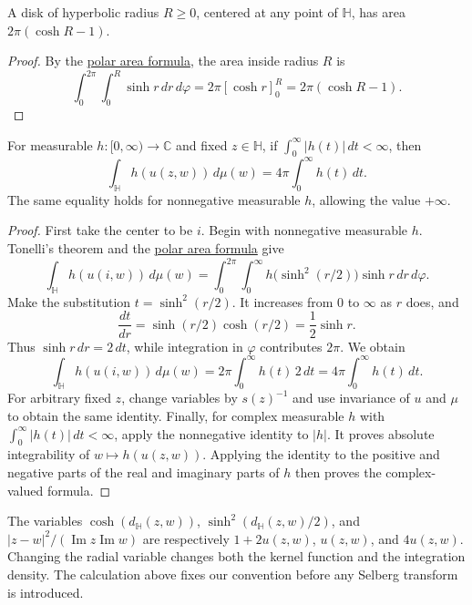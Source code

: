 \begin{corollary}\label{hyperbolic.ball-area}
A disk of hyperbolic radius $R\geq0$, centered at any point of $\mathbb H$, has area $2\pi(\cosh R-1)$.
\end{corollary}

\begin{proof}
By the \hyperref[hyperbolic.polar-coordinates]{polar area formula}, the area inside radius $R$ is
\[
 \int_0^{2\pi}\int_0^R\sinh r\,dr\,d\varphi
 =2\pi[\cosh r]_0^R=2\pi(\cosh R-1).
\]
\end{proof}

\begin{proposition}\label{hyperbolic.radial-integration}
For measurable $h:[0,\infty)\to\mathbb C$ and fixed $z\in\mathbb H$, if $\int_0^\infty|h(t)|\,dt<\infty$, then
\[
 \int_{\mathbb H}h(u(z,w))\,d\mu(w)=4\pi\int_0^\infty h(t)\,dt.
\]
The same equality holds for nonnegative measurable $h$, allowing the value $+\infty$.
\end{proposition}

\begin{proof}
First take the center to be $i$. Begin with nonnegative measurable $h$. Tonelli's theorem and the \hyperref[hyperbolic.polar-coordinates]{polar area formula} give
\[
 \int_{\mathbb H}h(u(i,w))\,d\mu(w)
 =\int_0^{2\pi}\int_0^\infty
     h\bigl(\sinh^2(r/2)\bigr)\sinh r\,dr\,d\varphi.
\]
Make the substitution $t=\sinh^2(r/2)$. It increases from $0$ to $\infty$ as $r$ does, and
\[
 \frac{dt}{dr}=\sinh(r/2)\cosh(r/2)=\frac12\sinh r.
\]
Thus $\sinh r\,dr=2\,dt$, while integration in $\varphi$ contributes $2\pi$. We obtain
\[
 \int_{\mathbb H}h(u(i,w))\,d\mu(w)
 =2\pi\int_0^\infty h(t)\,2\,dt
 =4\pi\int_0^\infty h(t)\,dt.
\]
For arbitrary fixed $z$, change variables by $s(z)^{-1}$ and use invariance of $u$ and $\mu$ to obtain the same identity. Finally, for complex measurable $h$ with $\int_0^\infty|h(t)|\,dt<\infty$, apply the nonnegative identity to $|h|$. It proves absolute integrability of $w\mapsto h(u(z,w))$. Applying the identity to the positive and negative parts of the real and imaginary parts of $h$ then proves the complex-valued formula.
\end{proof}

\begin{remark}\label{hyperbolic.radial-conventions}
The variables $\cosh(d_{\mathbb H}(z,w))$, $\sinh^2(d_{\mathbb H}(z,w)/2)$, and $|z-w|^2/(\operatorname{Im}z\operatorname{Im}w)$ are respectively $1+2u(z,w)$, $u(z,w)$, and $4u(z,w)$. Changing the radial variable changes both the kernel function and the integration density. The calculation above fixes our convention before any Selberg transform is introduced.
\end{remark}
